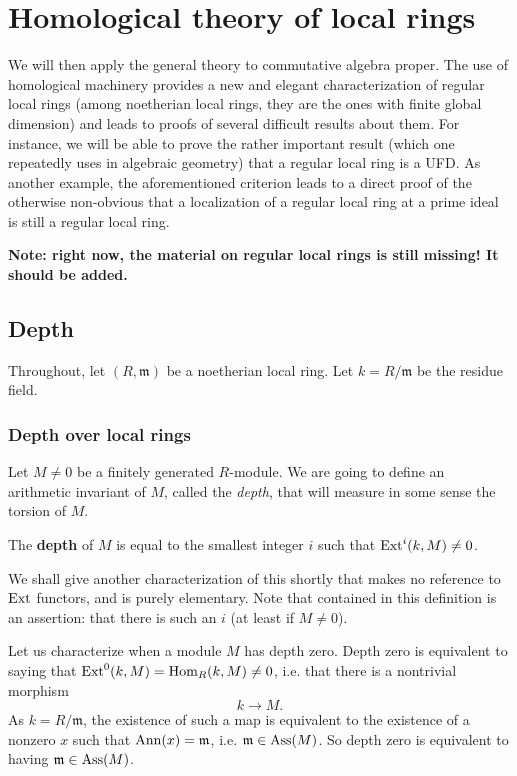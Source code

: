 \chapter{Homological theory of local rings}

We will then apply the general theory to commutative algebra proper. The use
of homological machinery provides a new and elegant characterization of regular local
rings (among noetherian local rings, they are the ones with finite global
dimension) and leads to proofs of several difficult results about them.
For instance, we will be able to prove the rather important result (which one
repeatedly uses in algebraic geometry) that a
regular local ring is a UFD.
As another example, the aforementioned criterion leads to a direct proof of
the otherwise non-obvious that a localization of a regular local ring at a
prime ideal is still a regular local ring.

\textbf{Note: right now, the material on regular local rings is still missing!
It should be added.}

\section{Depth}
Throughout, let $(R, \mathfrak{m})$ be  a noetherian
local ring. Let $k = R/\mathfrak{m}$ be the residue field. 


\subsection{Depth over local rings}
Let $M \neq 0$ be a finitely generated $R$-module. We are going to define an
arithmetic invariant of $M$, called the \emph{depth}, that will measure in
some sense the torsion of $M$.

\newcommand{\depth}{\operatorname{depth}}
\begin{definition}
The \textbf{depth} of $M$ is equal to the smallest integer $i$
such that
$\operatorname{Ext}^i(k,M) \neq 0$.
\end{definition}

We shall give another characterization of this shortly that makes no reference
to $\operatorname{Ext}$ functors, and is purely elementary.
Note that
contained in this definition is an assertion: that there is such
an $i$ (at least if $M \neq 0$).

\begin{example} Let us characterize when a module $M$ has depth zero. 
Depth zero is equivalent to saying that $\operatorname{Ext}^0(k,M) = \operatorname{Hom}_R(k, M) \neq 0$,
i.e. that there is a
nontrivial morphism
\[ k \to M.  \]
As $k = R/\mathfrak{m}$, the existence of such a map is
equivalent to the existence of a nonzero $x$
such that $\operatorname{Ann}(x) = \mathfrak{m}$, i.e. $\mathfrak{m} \in
\operatorname{Ass}(M)$. So depth
zero is equivalent to having $\mathfrak{m} \in \operatorname{Ass}(M)$.
\end{example}

